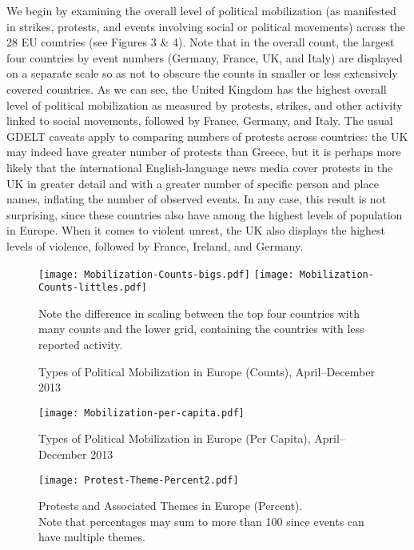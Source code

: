 \documentclass[10pt]{article}
\begin{document}
We begin by examining the overall level of political mobilization (as manifested in strikes, protests, and events involving social or political movements) across the 28 EU countries (see Figures 3 \& 4).  Note that in the overall count, the largest four countries by event numbers (Germany, France, UK, and Italy) are displayed on a separate scale so as not to obscure the counts in smaller or less extensively covered countries.  As we can see, the United Kingdom has the highest overall level of political mobilization as measured by protests, strikes, and other activity linked to social movements, followed by France, Germany, and Italy.  The usual GDELT caveats apply to comparing numbers of protests across countries: the UK may indeed have greater number of protests than Greece, but it is perhaps more likely that the international English-language news media cover protests in the UK in greater detail and with a greater number of specific person and place names, inflating the number of observed events.  In any case, this result is not surprising, since these countries also have among the highest levels of population in Europe.  When it comes to violent unrest, the UK also displays the highest levels of violence, followed by France, Ireland, and Germany.

\begin{figure*}
\begin{center}
\texttt{[image: Mobilization-Counts-bigs.pdf]}
\texttt{[image: Mobilization-Counts-littles.pdf]}
\caption{Types of Political Mobilization in Europe (Counts), April--December 2013}
\end{center}
Note the difference in scaling between the top four countries with many counts and the lower grid, containing the countries with less reported activity.
\end{figure*}



\begin{figure*}
\begin{center}
\texttt{[image: Mobilization-per-capita.pdf]}
\caption{Types of Political Mobilization in Europe (Per Capita), April--December 2013}
\end{center}
\end{figure*}



\begin{figure*}
\begin{center}
\texttt{[image: Protest-Theme-Percent2.pdf]}
\caption{Protests and Associated Themes in Europe (Percent). \\ Note that percentages may sum to more than 100 since events can have multiple themes.}
\end{center}
\end{figure*}
\end{document}
